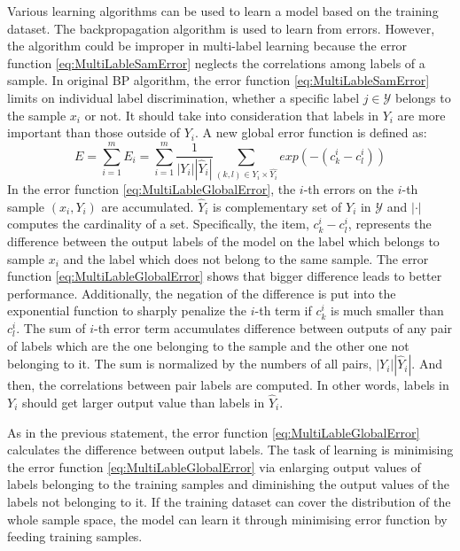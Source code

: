 Various learning algorithms can be used to learn a model based on the training dataset. The backpropagation algorithm is used to learn from errors. However, the algorithm could be improper in multi-label learning because the error function \ref{eq:MultiLableSamError} neglects the correlations among labels of a sample. In original BP algorithm, the error function \ref{eq:MultiLableSamError} limits on individual label discrimination, whether a specific label $j \in \mathcal{Y}$ belongs to the sample $x_{i}$ or not. It should take into consideration that labels in $Y_{i}$ are more important than those outside of $Y_{i}$. A new global error function is defined as:
\begin{equation}\label{eq:MultiLableGlobalError}
E = \sum_{i=1}^m E_{i} = \sum_{i=1}^m \frac{1}{|Y_{i}||\hat{Y}_{i}|} \sum_{(k,l) \in Y_{i} \times \hat{Y_{i}}} exp(-(c_{k}^i-c_{l}^i))
\end{equation}
In the error function \ref{eq:MultiLableGlobalError}, the $i$-th errors on the $i$-th sample $(x_{i},Y_{i})$ are accumulated. $\hat{Y}_{i}$ is complementary set of $Y_{i}$ in $\mathcal{Y}$ and $|\cdot|$ computes the cardinality of a set. Specifically, the item, $c_{k}^i-c_{l}^i$, represents the difference between the output labels of the model on the label which belongs to sample $x_{i}$ and the label which does not belong to the same sample. The error function \ref{eq:MultiLableGlobalError} shows that bigger difference leads to better performance. Additionally, the negation of the difference is put into the exponential function to sharply penalize the $i$-th term if $c_{k}^i$ is much smaller than $c_{l}^i$. The sum of $i$-th error term accumulates difference between outputs of any pair of labels which are the one belonging to the sample and the other one not belonging to it. The sum is normalized by the numbers of all pairs, $|Y_{i}||\hat{Y}_{i}|$. And then, the correlations between pair labels are computed. In other words, labels in $Y_{i}$ should get larger output value than labels in $\hat{Y}_{i}$.

As in the previous statement, the error function \ref{eq:MultiLableGlobalError} calculates the difference between output labels. The task of learning is minimising the error function \ref{eq:MultiLableGlobalError} via enlarging output values of labels belonging to the training samples and diminishing the output values of the labels not belonging to it. If the training dataset can cover the distribution of the whole sample space, the model can learn it through minimising error function by feeding training samples.

